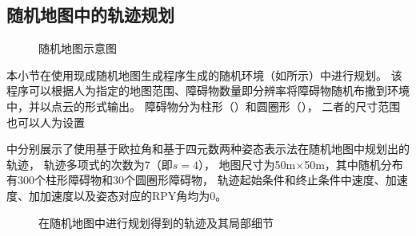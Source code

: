 \subsection{随机地图中的轨迹规划}\label{subsec:planning_in_random_map}
\begin{figure}[!ht]
    \setlength{\subfigcapskip}{-1bp}
    \centering
    \begin{minipage}{\textwidth}
  
    \centering
    \subfigure{\label{fig:random_map_overview}}\addtocounter{subfigure}{-2}
    \hspace{0.2em}
    \subfigure{\label{fig:cylinder_obstacles}}\addtocounter{subfigure}{-2}
    \hspace{0.2em}
    \subfigure{\label{fig:circle_obstacles}}\addtocounter{subfigure}{-2}
    
    \end{minipage}
    \caption{随机地图示意图}
    \label{fig:random_map}
  \end{figure}
本小节在使用现成随机地图生成程序生成的随机环境（如所示）中进行规划。
该程序可以根据人为指定的地图范围、障碍物数量即分辨率将障碍物随机布撒到环境中，并以点云的形式输出。
障碍物分为柱形（）和圆圈形（），
二者的尺寸范围也可以人为设置

中分别展示了使用基于欧拉角和基于四元数两种姿态表示法在随机地图中规划出的轨迹，
轨迹多项式的次数为7（即$s=4$），
地图尺寸为50m$\times$50m，其中随机分布有300个柱形障碍物和30个圆圈形障碍物，
轨迹起始条件和终止条件中速度、加速度、加加速度以及姿态对应的RPY角均为0。

\begin{figure}[!ht]
    \setlength{\subfigcapskip}{-1bp}
    \centering
    \begin{minipage}{\textwidth}
  
    \centering
    \subfigure{\label{fig:random_map_planning_rpy}}\addtocounter{subfigure}{-2}
    
    \subfigure{\label{fig:random_map_planning_quat}}\addtocounter{subfigure}{-2}
    
    \end{minipage}
    \caption{在随机地图中进行规划得到的轨迹及其局部细节}
    \label{fig:random_map_planning}
\end{figure}

